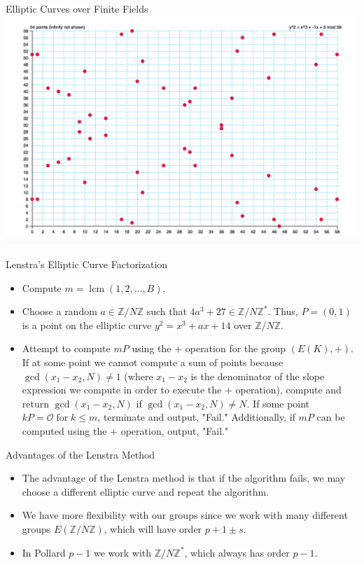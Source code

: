 \documentclass{beamer}
\DeclareMathOperator{\lcm}{lcm}
\DeclareMathOperator{\for}{for}
\begin{document}
	\begin{frame}{Elliptic Curves over Finite Fields}
		\includegraphics[scale=.4]{EllipticCurveFiniteField.png}
	\end{frame}
	
	\begin{frame}{Lenstra's Elliptic Curve Factorization}
		\begin{itemize}
			\item Compute $m=\lcm(1,2,\dotso,B)$. 
			\item Choose a random $a \in \mathbb{Z}/N\mathbb{Z}$ such that $4a^3+27 \in \mathbb{Z}/N\mathbb{Z}^*$. Thus, $P=(0,1)$ is a point on the elliptic curve $y^2=x^3+ax+14$ over $\mathbb{Z}/N\mathbb{Z}$.
			\item Attempt to compute $mP$ using the $+$ operation for the group $(E(K),+)$. If at some point we cannot compute a sum of points because $\gcd(x_1-x_2,N) \neq 1$ (where $x_1-x_2$ is the denominator of the slope expression we compute in order to execute the $+$ operation), compute and return $\gcd(x_1-x_2,N)$ if $\gcd(x_1-x_2,N) \neq N$. If some point $kP=\mathcal{O} \for k \leq m$, terminate and output, "Fail." Additionally, if $mP$ can be computed using the $+$ operation, output, "Fail."
		\end{itemize}
	\end{frame}
	
	\begin{frame}{Advantages of the Lenstra Method}
		\begin{itemize}
			\item The advantage of the Lenstra method is that if the algorithm fails, we may choose a different elliptic curve and repeat the algorithm.
			\item We have more flexibility with our groups since we work with many different groups $E(\mathbb{Z}/N\mathbb{Z})$, which will have order $p+1\pm s$.
			\item In Pollard $p-1$ we work with $\mathbb{Z}/N\mathbb{Z}^*$, which always has order $p-1$.
		\end{itemize}
	\end{frame}
	
\end{document}
